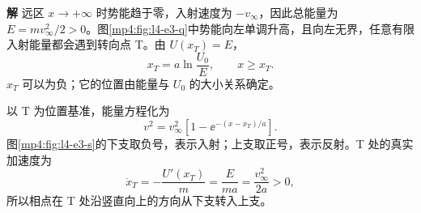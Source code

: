 \documentclass[11pt,openany,fontset=fandol]{ctexbook}
\theoremstyle{definition}\newtheorem{example}{例}[chapter]\newtheorem{exercise}{习题}[chapter]
\newcommand{\SolutionStart}{\par\medskip\ifdim\pagetotal>0pt\ifdim\dimexpr\pagegoal-\pagetotal\relax<3\baselineskip\newpage\fi\fi\noindent\textbf{解}\quad\ignorespaces}
\newenvironment{solution}{\SolutionStart}{\par\medskip}
\begin{document}
\begin{solution}
远区 $x\to+\infty$ 时势能趋于零，入射速度为 $-v_\infty$，因此总能量为 $E=mv_\infty^2/2>0$。图\ref{mp4:fig:l4-e3-q}中势能向左单调升高，且向左无界，任意有限入射能量都会遇到转向点 T。由 $U(x_T)=E$，
\[
x_T=a\ln\frac{U_0}{E},\qquad x\ge x_T.
\]
$x_T$ 可以为负；它的位置由能量与 $U_0$ 的大小关系确定。

以 T 为位置基准，能量方程化为
\[
v^2=v_\infty^2\left[1-\ee^{-(x-x_T)/a}\right].
\]
图\ref{mp4:fig:l4-e3-s}的下支取负号，表示入射；上支取正号，表示反射。T 处的真实加速度为
\[
\ddot x_T=-\frac{U'(x_T)}m=\frac E{ma}
=\frac{v_\infty^2}{2a}>0,
\]
所以相点在 T 处沿竖直向上的方向从下支转入上支。

\begin{figure}[H]\centering
{}
\end{figure}
\end{solution}
\end{document}
